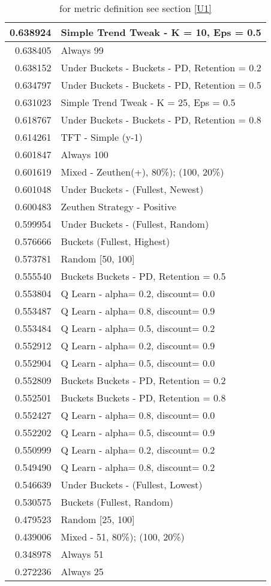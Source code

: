 \begin{table}[!hbtp]
\begin{footnotesize}
\begin{tabular}{|r|l|}
0.638924 & Simple Trend Tweak - K = 10, Eps = 0.5\\ \hline
0.638405 & Always 99\\ \hline
0.638152 & Under Buckets - Buckets - PD, Retention = 0.2\\ \hline
0.634797 & Under Buckets - Buckets - PD, Retention = 0.5\\ \hline
0.631023 & Simple Trend Tweak - K = 25, Eps = 0.5\\ \hline
0.618767 & Under Buckets - Buckets - PD, Retention = 0.8\\ \hline
0.614261 & TFT - Simple (y-1)\\ \hline
0.601847 & Always 100\\ \hline
0.601619 & Mixed - {Zeuthen(+), 80\%); (100, 20\%)}\\ \hline
0.601048 & Under Buckets - (Fullest, Newest)\\ \hline
0.600483 & Zeuthen Strategy - Positive\\ \hline
0.599954 & Under Buckets - (Fullest, Random)\\ \hline
0.576666 & Buckets (Fullest, Highest)\\ \hline
0.573781 & Random [50, 100]\\ \hline
0.555540 & Buckets Buckets - PD, Retention = 0.5\\ \hline
0.553804 & Q Learn - alpha= 0.2, discount= 0.0\\ \hline
0.553487 & Q Learn - alpha= 0.8, discount= 0.9\\ \hline
0.553484 & Q Learn - alpha= 0.5, discount= 0.2\\ \hline
0.552912 & Q Learn - alpha= 0.2, discount= 0.9\\ \hline
0.552904 & Q Learn - alpha= 0.5, discount= 0.0\\ \hline
0.552809 & Buckets Buckets - PD, Retention = 0.2\\ \hline
0.552501 & Buckets Buckets - PD, Retention = 0.8\\ \hline
0.552427 & Q Learn - alpha= 0.8, discount= 0.0\\ \hline
0.552202 & Q Learn - alpha= 0.5, discount= 0.9\\ \hline
0.550999 & Q Learn - alpha= 0.2, discount= 0.2\\ \hline
0.549490 & Q Learn - alpha= 0.8, discount= 0.2\\ \hline
0.546639 & Under Buckets - (Fullest, Lowest)\\ \hline
0.530575 & Buckets (Fullest, Random)\\ \hline
0.479523 & Random [25, 100]\\ \hline
0.439006 & Mixed - {51, 80\%); (100, 20\%)}\\ \hline
0.348978 & Always 51\\ \hline
0.272236 & Always 25\\ \hline
\end{tabular}
\caption{for metric definition see section \eqref{U1}}
\end{footnotesize}
\end{table}

